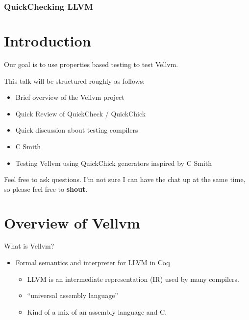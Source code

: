 \documentclass{beamer}
\author{
  Beck, Calvin\\
  \href{mailto:hobbes@seas.upenn.edu}{hobbes@seas.upenn.edu}
  \and\\~\\
  Zakowski, Yannick\\
  \href{mailto:zakowski@seas.upenn.edu}{zakowski@seas.upenn.edu}
}
\begin{document}
\begin{frame}
  \frametitle{QuickChecking LLVM}
  \maketitle
\end{frame}

\section{Introduction}

\begin{frame}

  Our goal is to use properties based testing to test Vellvm.

  This talk will be structured roughly as follows:
  
  \begin{itemize}
  \item Brief overview of the Vellvm project
  \item Quick Review of QuickCheck / QuickChick
  \item Quick discussion about testing compilers
  \item C Smith
  \item Testing Vellvm using QuickChick generators inspired by C Smith
  \end{itemize}

  Feel free to ask questions. I'm not sure I can have the chat up at
  the same time, so please feel free to {\bf shout}.
\end{frame}

\section{Overview of Vellvm}

\begin{frame}
  What is Vellvm?

  \begin{itemize}
  \item Formal semantics and interpreter for LLVM in Coq
    \begin{itemize}
    \item LLVM is an intermediate representation (IR) used by many
      compilers.
    \item ``universal assembly language''
    \item Kind of a mix of an assembly language and C.
    \end{itemize}
  \end{itemize}
\end{frame}
\end{document}
